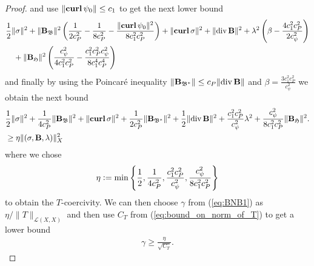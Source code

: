\documentclass[../master_thesis.tex]{subfiles}
\begin{document}
\begin{proof}
    and use $\lVert \veccurl \psi_0 \rVert \leq c_1$ 
    to get the next lower bound
    \begin{align*}
        &\frac{1}{2} \lVert \sigma \rVert^2 + \lVert \mathbf{B}_\mathfrak{B} \rVert^2 
        \left( \frac{1}{2 c_P^2} - \frac{1}{8 c_P^2} 
        - \frac{\lVert  \veccurl \psi_0 \rVert^2}{8 c_1^2 c_P^2} \right)
        + \lVert  \veccurl \sigma \rVert^2 + \lVert \diver \mathbf{B} \rVert ^2
        + \lambda ^2 \left( \beta - \frac{4 c_1^2 c_P^2}{2 c_\psi^2} \right)
        \\ &\quad+ \lVert \mathbf{B}_\mathfrak{H} \rVert^2  \left( \frac{c_\psi^2}{4 c_1^2 c_P^2 }
        - \frac{ c_1^2 c_P^2 c_\psi^2}{8 c_1^4 c_P^4} \right)
    \end{align*}
    and finally by using the Poincaré inequality $\lVert \mathbf{B}_{\mathfrak{B}^*} \rVert 
    \leq c_P \lVert \diver \mathbf{B} \rVert$
    and $\beta = \frac{3 c_1^2 c_P^2}{c_\psi^2}$ we obtain the next bound
    \begin{align*}
        &\frac{1}{2} \lVert \sigma \rVert^2 + \frac{1}{4 c_P^2}\lVert \mathbf{B}_\mathfrak{B} \rVert^2 
            + \lVert  \veccurl \sigma \rVert^2
            + \frac{1}{2 c_P^2 } \lVert\mathbf{B}_{\mathfrak{B}^*}\rVert ^2
            + \frac{1}{2} \lVert \diver \mathbf{B} \rVert ^2
            + \frac{c_1^2 c_P^2}{c_\psi^2}\lambda^2
            + \frac{c_\psi^2}{8 c_1^2 c_P^2} \lVert \mathbf{B}_\mathfrak{H} \rVert^2.
        \\ &\geq \eta \lVert (\sigma,\mathbf{B},\lambda) \rVert^2_X 
    \end{align*}
    where we chose 
    \begin{align*}
        \eta \vcentcolon= \min \left\{ \frac{1}{2},  \frac{1}{4 c_P^2}, \frac{c_1^2 c_P^2}{c_\psi^2},
        \frac{c_\psi^2}{8 c_1^2 c_P^2}\right\} 
    \end{align*}
    to obtain the $T$-coercivity.
We can then choose $\gamma$ from (\ref{eq:BNB1}) as $\eta/\lVert T \rVert _{\mathcal{L}(X,X)}$
and then use $C_T$ from (\ref{eq:bound_on_norm_of_T}) to get a lower bound
\begin{align*}
    \gamma \geq \frac{\eta}{\sqrt{C_T}}. 
\end{align*}
\end{proof}
\end{document}
